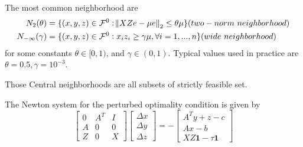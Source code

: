 \begin{refsection}
\begin{definition}
The  most common neighborhood are
\begin{align*}
N_2(\theta) &= \{(x,y,z) \in \mathcal{F}^0: \norm{XZe - \mu e}_2 \leq \theta \mu \} (two-norm~ neighborhood)\\
N_{-\infty}(\gamma) &= \{(x,y,z) \in \mathcal{F}^0: x_iz_i\geq \gamma \mu, \forall i=1,...,n \} (wide~ neighborhood)
\end{align*}
for some constants $\theta\in [0,1)$, and $\gamma\in (0,1)$. Typical values used in practice are
$\theta = 0.5, \gamma = 10^{-3}$.
\end{definition}

\begin{remark}
Those Central neighborhoods are all subsets of strictly feasible set.    
\end{remark}


\begin{definition}
The Newton system for the perturbed optimality condition is given by
$$  
\begin{bmatrix}
0 & A^T & I \\
A & 0 & 0 \\
Z & 0 & X
\end{bmatrix} \begin{bmatrix}
\Delta x\\
\Delta y\\
\Delta z
\end{bmatrix} = -\begin{bmatrix}
A^Ty + z - c\\
Ax - b \\
XZ\bm{1} - \tau\bm{1} 
\end{bmatrix}
$$	
\end{definition}


\end{refsection}

